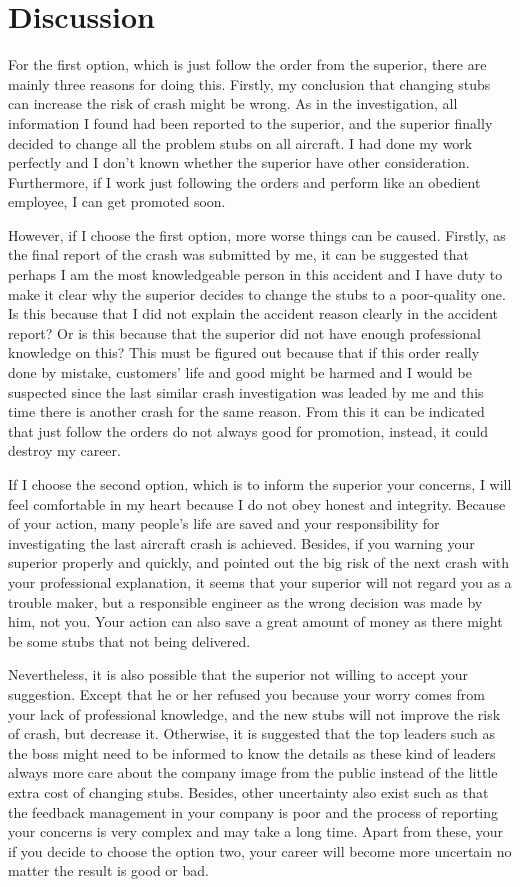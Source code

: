 \documentclass[11pt, a4paper]{article}
\begin{document}
\section{Discussion}

For the first option, which is just follow the order from the superior, there are mainly three reasons for doing this. Firstly, my conclusion that changing stubs can increase the risk of crash might be wrong. As in the investigation, all information I found had been reported to the superior, and the superior finally decided to change all the problem stubs on all aircraft. I had done my work perfectly and I don't known whether the superior have other consideration. Furthermore, if I work just following the orders and perform like an obedient employee, I can get promoted soon.

However, if I choose the first option, more worse things can be caused. Firstly, as the final report of the crash was submitted by me, it can be suggested that perhaps I am the most knowledgeable person in this accident and I have duty to make it clear why the superior decides to change the stubs to a poor-quality one. Is this because that I did not explain the accident reason clearly in the accident report? Or is this because that the superior did not have enough professional knowledge on this? This must be figured out because that if this order really done by mistake, customers' life and good might be harmed and I would be suspected since the last similar crash investigation was leaded by me and this time there is another crash for the same reason. From this it can be indicated that just follow the orders do not always good for promotion, instead, it could destroy my career.

If I choose the second option, which is to inform the superior your concerns, I will feel comfortable in my heart because I do not obey honest and integrity. Because of your action, many people's life are saved and your responsibility for investigating the last aircraft crash is achieved. Besides, if you warning your superior properly and quickly, and pointed out the big risk of the next crash with your professional explanation, it seems that your superior will not regard you as a trouble maker, but a responsible engineer as the wrong decision was made by him, not you. Your action can also save a great amount of money as there might be some stubs that not being delivered.

Nevertheless, it is also possible that the superior not willing to accept your suggestion. Except that he or her refused you because your worry comes from your lack of professional knowledge, and the new stubs will not improve the risk of crash, but decrease it. Otherwise, it is suggested that the top leaders such as the boss might need to be informed to know the details as these kind of leaders always more care about the company image from the public instead of the little extra cost of changing stubs. Besides, other uncertainty also exist such as that the feedback management in your company is poor and the process of reporting your concerns is very complex and may take a long time. Apart from these, your if you decide to choose the option two, your career will become more uncertain no matter the result is good or bad.
\end{document}

